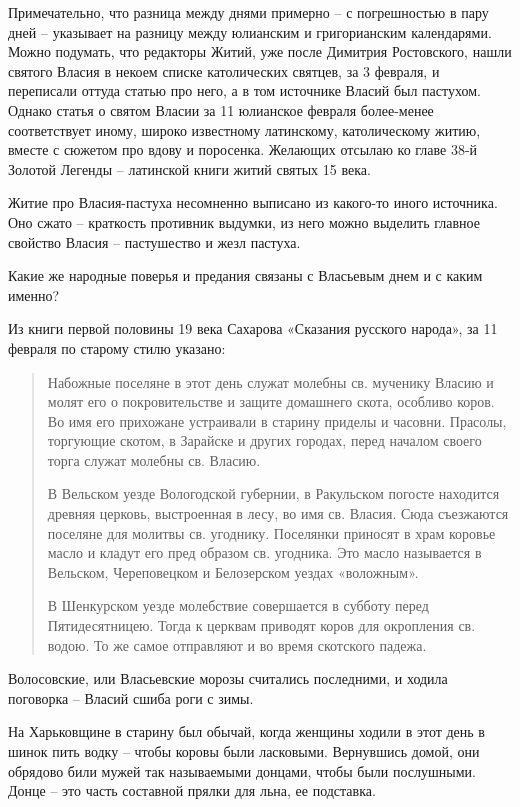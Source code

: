 \documentclass[a5paper,11pt,openany]{article}
\begin{document}
 Примечательно, что разница между днями примерно – с погрешностью в пару дней – указывает на разницу между юлианским и григорианским календарями. Можно подумать, что редакторы Житий, уже после Димитрия Ростовского, нашли святого Власия в некоем списке католических святцев, за 3 февраля, и переписали оттуда статью про него, а в том источнике Власий был пастухом. Однако статья о святом Власии за 11 юлианское февраля более-менее соответствует иному, широко известному латинскому, католическому житию, вместе с сюжетом про вдову и поросенка. Желающих отсылаю ко главе 38-й Золотой Легенды – латинской книги житий святых 15 века.

   Житие про Власия-пастуха несомненно выписано из какого-то иного источника. Оно сжато – краткость противник выдумки, из него можно выделить главное свойство Власия – пастушество и жезл пастуха.

  Какие же народные поверья и предания связаны с Власьевым днем и с каким именно?

   Из книги первой половины 19 века Сахарова «Сказания русского народа», за 11 февраля по старому стилю указано:

\begin{quotation}
\noindent Набожные поселяне в этот день служат молебны св. мученику Власию и молят его о покровительстве и защите домашнего скота, особливо коров. Во имя его прихожане устраивали в старину приделы и часовни. Прасолы, торгующие скотом, в Зарайске и других городах, перед началом своего торга служат молебны св. Власию. 

В Вельском уезде Вологодской губернии, в Ракульском погосте находится древняя церковь, выстроенная в лесу, во имя св. Власия. Сюда съезжаются поселяне для молитвы св. угоднику. Поселянки приносят в храм коровье масло и кладут его пред образом св. угодника. Это масло называется в Вельском, Череповецком и Белозерском уездах «воложным». 

В Шенкурском уезде молебствие совершается в субботу перед Пятидесятницею. Тогда к церквам приводят коров для окропления св. водою. То же самое отправляют и во время скотского падежа.
\end{quotation}

   Волосовские, или Власьевские морозы считались последними, и ходила поговорка – Власий сшиба роги с зимы.

   На Харьковщине в старину был обычай, когда женщины ходили в этот день в шинок пить водку – чтобы коровы были ласковыми. Вернувшись домой, они обрядово били мужей так называемыми донцами, чтобы были послушными. Донце – это часть составной прялки для льна, ее подставка.
\end{document}
